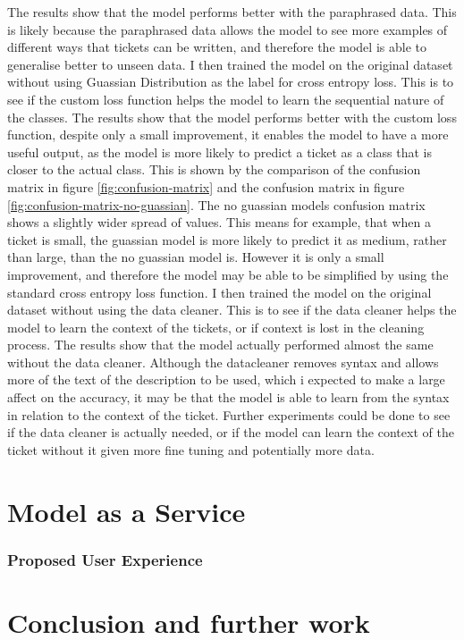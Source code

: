 \documentclass{UoYCSproject}
\begin{document}
    The results show that the model performs better with the paraphrased data. This is likely because the paraphrased data allows the model to see more examples of different ways that tickets can be written, and therefore the model is able to generalise better to unseen data.
    I then trained the model on the original dataset without using Guassian Distribution as the label for cross entropy loss.  This is to see if the custom loss function helps the model to learn the sequential nature of the classes.
    The results show that the model performs better with the custom loss function, despite only a small improvement, it enables the model to have a more useful output, as the model is more likely to predict a ticket as a class that is closer to the actual class. This is shown by the comparison of the confusion matrix in figure \ref{fig:confusion-matrix} and the confusion matrix in figure \ref{fig:confusion-matrix-no-guassian}. The no guassian models confusion matrix shows a slightly wider spread of values. This means for example, that when a ticket is small, the guassian model is more likely to predict it as medium, rather than large, than the no guassian model is.
    However it is only a small improvement, and therefore the model may be able to be simplified by using the standard cross entropy loss function.
    I then trained the model on the original dataset without using the data cleaner. This is to see if the data cleaner helps the model to learn the context of the tickets, or if context is lost in the cleaning process.
    The results show that the model actually performed almost the same without the data cleaner. Although the datacleaner removes syntax and allows more of the text of the description to be used, which i expected to make a large affect on the accuracy, it may be that the model is able to learn from the syntax in relation to the context of the ticket.
    Further experiments could be done to see if the data cleaner is actually needed, or if the model can learn the context of the ticket without it given more fine tuning and potentially more data.












    \chapter{Model as a Service}
    \label{ch:model-as-a-service}
    \subsection[Proposed User Experience]{Proposed User Experience}


    \chapter{Conclusion and further work}
    \label{ch:conclusion}

\printbibliography
\end{document}
